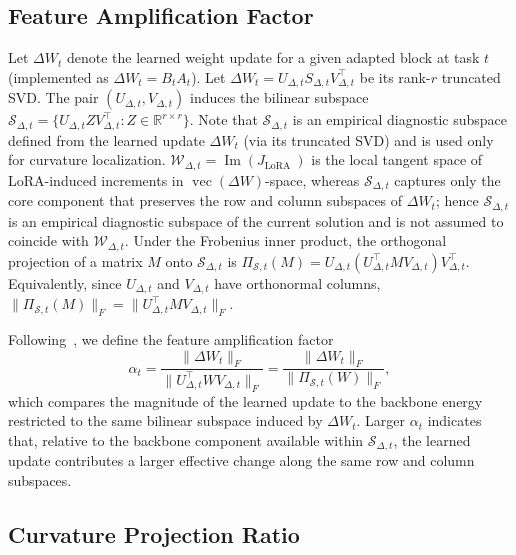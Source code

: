 \documentclass{article}
\theoremstyle{plain}
\theoremstyle{definition}
\theoremstyle{remark}
\begin{document}
\subsection{Feature Amplification Factor}
\label{app:feature_amplification}

Let $\Delta W_t$ denote the learned weight update for a given adapted block at task $t$ (implemented as $\Delta W_t = B_t A_t$).
Let
$
\Delta W_t = U_{\Delta,t} S_{\Delta,t} V_{\Delta,t}^\top
$
be its rank-$r$ truncated SVD. The pair $(U_{\Delta,t},V_{\Delta,t})$ induces the bilinear subspace
$
\mathcal S_{\Delta,t}=\{U_{\Delta,t} Z V_{\Delta,t}^\top : Z\in\mathbb{R}^{r\times r}\}.
$
Note that $\mathcal{S}_{\Delta, t}$ is an empirical diagnostic subspace defined from the learned update $\Delta W_t$ (via its truncated SVD) and is used only for curvature localization. $\mathcal{W}_{\Delta, t}=\operatorname{Im}\left(J_{\text {LoRA }}\right)$ is the local tangent space of LoRA-induced increments in $\operatorname{vec}(\Delta W)$-space, whereas $\mathcal{S}_{\Delta, t}$ captures only the core component that preserves the row and column subspaces of $\Delta W_t$; hence $\mathcal{S}_{\Delta, t}$ is an empirical diagnostic subspace of the current solution and is not assumed to coincide with $\mathcal{W}_{\Delta, t}$.
Under the Frobenius inner product, the orthogonal projection of a matrix $M$ onto $\mathcal S_{\Delta,t}$ is
$
\Pi_{\mathcal S,t}(M)=U_{\Delta,t}(U_{\Delta,t}^\top M V_{\Delta,t})V_{\Delta,t}^\top.
$
Equivalently, since $U_{\Delta,t}$ and $V_{\Delta,t}$ have orthonormal columns,
$\|\Pi_{\mathcal S,t}(M)\|_F = \|U_{\Delta,t}^\top M V_{\Delta,t}\|_F.
$



Following~\cite{hu_lora_2021}, we define the feature amplification factor
\[
\alpha_t=\frac{\|\Delta W_t\|_F}{\|U_{\Delta,t}^\top W V_{\Delta,t}\|_F}
=\frac{\|\Delta W_t\|_F}{\|\Pi_{\mathcal S,t}(W)\|_F},
\]
which compares the magnitude of the learned update to the backbone energy restricted to the same bilinear subspace induced by $\Delta W_t$.
Larger $\alpha_t$ indicates that, relative to the backbone component available within $\mathcal S_{\Delta,t}$, the learned update contributes a larger effective change along the same row and column subspaces.

\subsection{Curvature Projection Ratio}
\label{app:curvature_preference}
\end{document}

